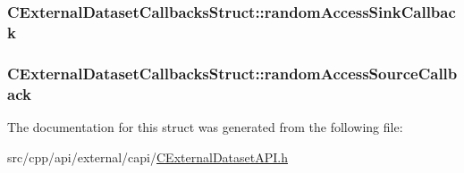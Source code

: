 \label{structCExternalDatasetCallbacksStruct_a1fc1a36f177ee26b40a9ac4148fa2545}
\hypertarget{structCExternalDatasetCallbacksStruct_aa3b705a806256dba13eaa4ad3dc9dcc7}{
\subsubsection[{randomAccessSinkCallback}]{ {\bf CExternalDatasetCallbacksStruct::randomAccessSinkCallback}}}
\label{structCExternalDatasetCallbacksStruct_aa3b705a806256dba13eaa4ad3dc9dcc7}
\hypertarget{structCExternalDatasetCallbacksStruct_af17a6cb4f56e557021adbe64a0478fdd}{
\subsubsection[{randomAccessSourceCallback}]{ {\bf CExternalDatasetCallbacksStruct::randomAccessSourceCallback}}}
\label{structCExternalDatasetCallbacksStruct_af17a6cb4f56e557021adbe64a0478fdd}


The documentation for this struct was generated from the following file:\begin{DoxyCompactItemize}
\item 
src/cpp/api/external/capi/\hyperlink{CExternalDatasetAPI_8h}{CExternalDatasetAPI.h}\end{DoxyCompactItemize}
